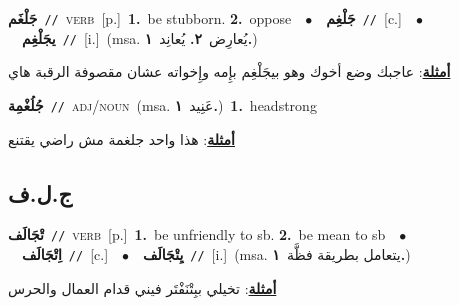 \documentclass[10pt,a4paper,twoside]{article} %
\begin{document}
\begin{multicols}{2}
{\setlength\topsep{0pt}\textbf{\foreignlanguage{arabic}{جَلْغَم}}\ {\color{gray}\texttt{//}\color{black}}\ \textsc{verb}\ [p.]\ \textbf{1.}~be stubborn.  \textbf{2.}~oppose\ \ $\bullet$\ \ \setlength\topsep{0pt}\textbf{\foreignlanguage{arabic}{جَلْغِم}}\ {\color{gray}\texttt{//}\color{black}}\ [c.]\ \ $\bullet$\ \ \setlength\topsep{0pt}\textbf{\foreignlanguage{arabic}{يجَلْغِم}}\ {\color{gray}\texttt{//}\color{black}}\ [i.]\ \color{gray}(msa. \foreignlanguage{arabic}{يُعارِض}~\foreignlanguage{arabic}{\textbf{٢.}}  \foreignlanguage{arabic}{يُعانِد}~\foreignlanguage{arabic}{\textbf{١.}})\color{black}\  \begin{flushright}\color{gray}\foreignlanguage{arabic}{\textbf{\underline{\foreignlanguage{arabic}{أمثلة}}}: عاجبك وضع أخوك وهو بيجَلْغِم بإِمه وإِخواته عشان مقصوفة الرقبة هاي}\end{flushright}\color{black}} \vspace{2mm}

{\setlength\topsep{0pt}\textbf{\foreignlanguage{arabic}{جُلُغْمِة}}\ {\color{gray}\texttt{//}\color{black}}\ \textsc{adj/noun}\ \color{gray}(msa. \foreignlanguage{arabic}{عَنِيد}~\foreignlanguage{arabic}{\textbf{١.}})\color{black}\ \textbf{1.}~headstrong\  \begin{flushright}\color{gray}\foreignlanguage{arabic}{\textbf{\underline{\foreignlanguage{arabic}{أمثلة}}}: هذا واحد جلغمة مش راضي يقتنع}\end{flushright}\color{black}} \vspace{2mm}

\vspace{-3mm}
\subsection*{\color{blue}\foreignlanguage{arabic}{ج.ل.ف}\color{blue}{}} 

{\setlength\topsep{0pt}\textbf{\foreignlanguage{arabic}{تْجَالَف}}\ {\color{gray}\texttt{//}\color{black}}\ \textsc{verb}\ [p.]\ \textbf{1.}~be unfriendly to sb.  \textbf{2.}~be mean to sb\ \ $\bullet$\ \ \setlength\topsep{0pt}\textbf{\foreignlanguage{arabic}{اِتْجَالَف}}\ {\color{gray}\texttt{//}\color{black}}\ [c.]\ \ $\bullet$\ \ \setlength\topsep{0pt}\textbf{\foreignlanguage{arabic}{يِتْجَالَف}}\ {\color{gray}\texttt{//}\color{black}}\ [i.]\ \color{gray}(msa. \foreignlanguage{arabic}{يتعامل بطريقة فظَّة}~\foreignlanguage{arabic}{\textbf{١.}})\color{black}\  \begin{flushright}\color{gray}\foreignlanguage{arabic}{\textbf{\underline{\foreignlanguage{arabic}{أمثلة}}}: تخيلي ببِتْنَفْتَر فيني قدام العمال والحرس}\end{flushright}\color{black}} \vspace{2mm}


\end{multicols}
\end{document}
